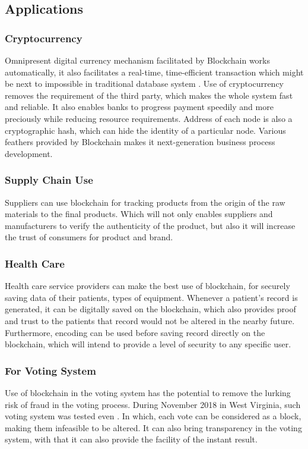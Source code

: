 \documentclass[a4paper,twoside,12pt]{report}
\begin{document}
\begin{spacing}{1.5}
\section{Applications}
\subsubsection{Cryptocurrency}
Omnipresent digital currency mechanism facilitated by Blockchain works automatically, it also facilitates a real-time, time-efficient transaction which might be next to impossible in traditional database system \cite{overviewofblockchainsecurity,democraticmininginbitcoins}. Use of cryptocurrency removes the requirement of the third party, which makes the whole system fast and reliable. It also enables banks to progress payment speedily and more preciously while reducing resource requirements.
Address of each node is also a cryptographic hash, which can hide the identity of a particular node.  Various feathers provided by Blockchain makes it next-generation business process development.
\subsubsection{Supply Chain Use}
Suppliers can use blockchain for tracking products from the origin of the raw materials to the final products. Which will not only enables suppliers and manufacturers to verify the authenticity of the product, but also it will increase the trust of consumers for product and brand.
\subsubsection{Health Care}
Health care service providers can make the best use of blockchain, for securely saving data of their patients, types of equipment. Whenever a patient's record is generated, it can be digitally saved on the blockchain, which also provides proof and trust to the patients that record would not be altered in the nearby future. Furthermore, encoding can be used before saving record directly on the blockchain, which will intend to provide a level of security to any specific user. 
\subsubsection{For Voting System}
Use of blockchain in the voting system has the potential to remove the lurking risk of fraud in the voting process. During November 2018 in West Virginia, such voting system was tested even \cite{blockchain_in_voting}. In which, each vote can be considered as a block, making them infeasible to be altered. It can also bring transparency in the voting system, with that it can also provide the facility of the instant result.

\end{spacing}
\end{document}
